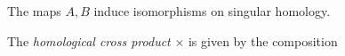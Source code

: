 \begin{theorem}
  The maps $A, B$ induce isomorphisms on
  singular homology.
\end{theorem}

\begin{definition}
  The \emph{homological cross product}
  $\times$ is given by the composition
  \begin{center}
  \end{center}
\end{definition}
